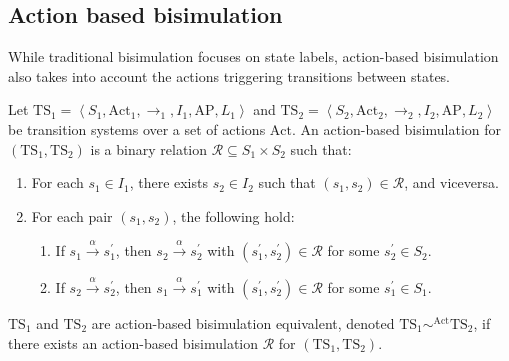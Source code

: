 \subsection{Action based bisimulation}
While traditional bisimulation focuses on state labels, action-based bisimulation also takes into account the actions triggering transitions between states.
\begin{definition}
    Let $\text{TS}_1=\left\langle S_1,\text{Act}_1,\rightarrow_1,I_1,\text{AP},L_1\right\rangle$ and $\text{TS}_2=\left\langle S_2,\text{Act}_2,\rightarrow_2,I_2,\text{AP},L_2\right\rangle$ be transition systems over a set of actions $\text{Act}$.
    An action-based bisimulation for $(\text{TS}_1,\text{TS}_2)$ is a binary relation $\mathcal{R}\subseteq S_1\times S_2$ such that: 
    \begin{enumerate}
        \item For each $s_1\in I_1$, there exists $s_2\in I_2$ such that $(s_1,s_2)\in\mathcal{R}$, and viceversa.
        \item For each pair $(s_1,s_2)$, the following hold:
            \begin{enumerate}
                \item If $s_1\overset{\alpha}{\rightarrow}s_1^\prime$, then $s_2\overset{\alpha}{\rightarrow}s_2^\prime$ with $(s_1^\prime,s_2^\prime)\in\mathcal{R}$ for some $s_2^\prime\in S_2$.
                \item If $s_2\overset{\alpha}{\rightarrow}s_2^\prime$, then $s_1\overset{\alpha}{\rightarrow}s_1^\prime$ with $(s_1^\prime,s_2^\prime)\in\mathcal{R}$ for some $s_1^\prime\in S_1$.
            \end{enumerate}
    \end{enumerate}
    $\text{TS}_1$ and $\text{TS}_2$ are action-based bisimulation equivalent, denoted $\text{TS}_1\sim^{\text{Act}}\text{TS}_2$, if there exists an action-based bisimulation $\mathcal{R}$ for $(\text{TS}_1,\text{TS}_2)$.
\end{definition}